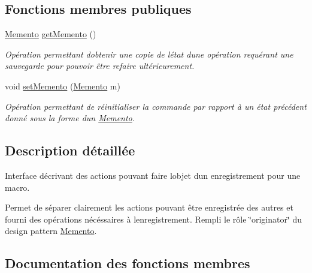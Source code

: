 \subsection*{Fonctions membres publiques}
\begin{DoxyCompactItemize}
\item 
\hyperlink{interfacefr_1_1istic_1_1m1_1_1aco_1_1miniediteur_1_1v1_1_1Memento}{Memento} \hyperlink{interfacefr_1_1istic_1_1m1_1_1aco_1_1miniediteur_1_1v1_1_1Enregistrable_aadf173c765d103d3924bbb688c45abb6}{get\+Memento} ()
\begin{DoxyCompactList}\small\item\em Opération permettant d\textquotesingle{}obtenir une copie de l\textquotesingle{}état d\textquotesingle{}une opération requérant une sauvegarde pour pouvoir être refaire ultérieurement. \end{DoxyCompactList}\item 
void \hyperlink{interfacefr_1_1istic_1_1m1_1_1aco_1_1miniediteur_1_1v1_1_1Enregistrable_a949bb6784743800c2d743def265f41b1}{set\+Memento} (\hyperlink{interfacefr_1_1istic_1_1m1_1_1aco_1_1miniediteur_1_1v1_1_1Memento}{Memento} m)
\begin{DoxyCompactList}\small\item\em Opération permettant de réinitialiser la commande par rapport à un état précédent donné sous la forme d\textquotesingle{}un \hyperlink{interfacefr_1_1istic_1_1m1_1_1aco_1_1miniediteur_1_1v1_1_1Memento}{Memento}. \end{DoxyCompactList}\end{DoxyCompactItemize}


\subsection{Description détaillée}
Interface décrivant des actions pouvant faire l\textquotesingle{}objet d\textquotesingle{}un enregistrement pour une macro. 

Permet de séparer clairement les actions pouvant être enregistrée des autres et fourni des opérations nécéssaires à l\textquotesingle{}enregistrement. Rempli le rôle \char`\"{}originator\char`\"{} du design pattern \hyperlink{interfacefr_1_1istic_1_1m1_1_1aco_1_1miniediteur_1_1v1_1_1Memento}{Memento}. 

\subsection{Documentation des fonctions membres}
\mbox{\label{interfacefr_1_1istic_1_1m1_1_1aco_1_1miniediteur_1_1v1_1_1Enregistrable_aadf173c765d103d3924bbb688c45abb6}} 
